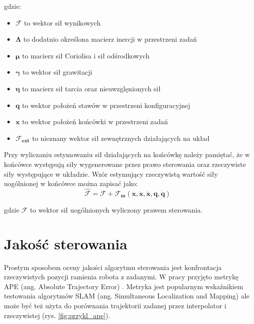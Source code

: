 gdzie:
\begin{itemize}
	\item $\boldsymbol{\mathcal{F}}$ to wektor sił wynikowych
	\item $\boldsymbol{\Lambda}$ to dodatnio określona macierz inercji w przestrzeni zadań
	\item $\boldsymbol{\mu}$ to macierz sił Coriolisa i sił odśrodkowych	
	\item $\boldsymbol{\gamma}$ to wektor sił grawitacji
	\item $\boldsymbol{\eta}$ to macierz sił tarcia oraz nieuwzglęnionych sił
	\item $\boldsymbol{q}$ to wektor położeń stawów w przestrzeni konfiguracyjnej
	\item $\boldsymbol{x}$ to wektor położeń końcówki w przestrzeni zadań
	\item $ \boldsymbol{\mathcal{F}_{ext}}$ to nieznany wektor sił zewnętrznych działających na układ
\end{itemize} 

Przy wyliczaniu estymowaniu sił działających na końcówkę należy pamiętać, że w końcówce występują siły wygenerowane przez prawo sterowania oraz rzeczywiste siły występujące w układzie. Wzór estymujący rzeczywistą wartość siły uogólnionej w końcówce można zapisać jako:
\begin{equation}
\boldsymbol{\mathcal{\hat{F}}} = \boldsymbol{\mathcal{F}} + \boldsymbol{\mathcal{F}_m}(\boldsymbol{x}, \dot{\boldsymbol{x}}, \ddot{\boldsymbol{x}}, \boldsymbol{q}, \dot{\boldsymbol{q}})
\end{equation}

gdzie $\boldsymbol{\mathcal{F}}$ to wektor sił uogólnionych wyliczony prawem sterowania.

\section{Jakość sterowania}
\label{chap:ape}
Prostym sposobem oceny jakości algorytmu sterowania jest konfrontacja rzeczywistych pozycji ramienia robota z zadanymi. W pracy przyjęto metrykę APE (ang. Absolute Trajectory Error) \cite{bib:ape}. Metryka jest popularnym wskaźnikiem testowania algorytmów SLAM (ang. Simultaneous Localization and Mapping) ale może być też użyta do porównania trajektorii zadanej przez interpolator i rzeczywistej (rys. \ref{fig:przykl_ape}). 

